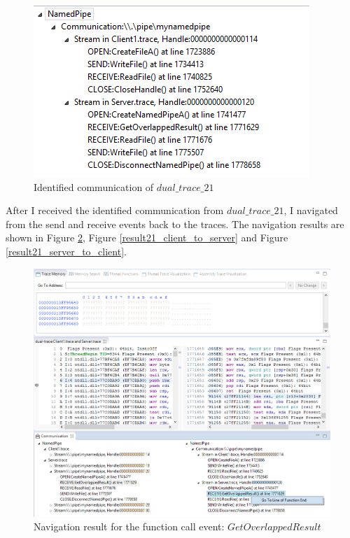 \documentclass[12pt,oneside]{book}
\providecommand{\DIFaddbeginFL}{} %
\providecommand{\DIFaddendFL}{} %
\providecommand{\DIFdelbeginFL}{} %
\providecommand{\DIFdelendFL}{} %
\newcommand{\DIFscaledelfig}{0.5}
\newlength{\DIFdelgraphicswidth} %
\newlength{\DIFdelgraphicsheight} %
\newcommand{\DIFaddincludegraphics}[2][]{{\color{blue}\fbox{\DIFOincludegraphics[#1]{#2}}}} %
\newcommand{\DIFdelincludegraphics}[2][]{%
\sbox{\DIFdelgraphicsbox}{\DIFOincludegraphics[#1]{#2}}%
\settoboxwidth{\DIFdelgraphicswidth}{\DIFdelgraphicsbox} %
\settoboxtotalheight{\DIFdelgraphicsheight}{\DIFdelgraphicsbox} %
\scalebox{\DIFscaledelfig}{%
\parbox[b]{\DIFdelgraphicswidth}{\usebox{\DIFdelgraphicsbox}\\[-\baselineskip] \rule{\DIFdelgraphicswidth}{0em}}\llap{\resizebox{\DIFdelgraphicswidth}{\DIFdelgraphicsheight}{%
\setlength{\unitlength}{\DIFdelgraphicswidth}%
\begin{picture}(1,1)%
\thicklines\linethickness{2pt} %
{\color[rgb]{1,0,0}\put(0,0){\framebox(1,1){}}}%
{\color[rgb]{1,0,0}\put(0,0){\line( 1,1){1}}}%
{\color[rgb]{1,0,0}\put(0,1){\line(1,-1){1}}}%
\end{picture}%
}\hspace*{3pt}}} %
} %
\DeclareRobustCommand{\DIFaddbeginFL}{\DIFOaddbeginFL \let\includegraphics\DIFaddincludegraphics} %
\DeclareRobustCommand{\DIFaddendFL}{\DIFOaddendFL \let\includegraphics\DIFOincludegraphics} %
\DeclareRobustCommand{\DIFdelbeginFL}{\DIFOdelbeginFL \let\includegraphics\DIFdelincludegraphics} %
\DeclareRobustCommand{\DIFdelendFL}{\DIFOaddendFL \let\includegraphics\DIFOincludegraphics} %
\begin{document}
\begin{figure}[H]
\centerline{\includegraphics{Figures/result21_communications}}
 \caption{Identified communication of $dual\_trace\_21$}
\label{result21_communications}
\end{figure}

After I received the identified communication from $dual\_trace\_21$, I navigated from the send and receive events back to the traces. The navigation results are shown in Figure \ref{result21_server_readnull},  Figure \ref{result21_client_to_server} and Figure \ref{result21_server_to_client}.

\begin{figure}[H]
\DIFdelbeginFL %
\DIFdelendFL \DIFaddbeginFL \centerline{\includegraphics[scale=0.7]{Figures/result21_server_readnull}}
 \DIFaddendFL \caption{Navigation result for the function call event: $GetOverlappedResult$}
\label{result21_server_readnull}
\end{figure}
\end{document}
